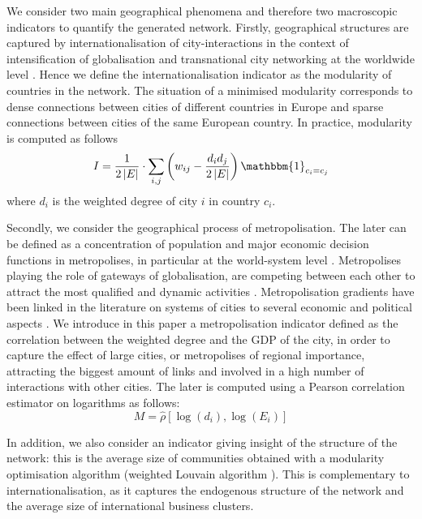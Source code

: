 \documentclass[10pt,letterpaper]{article}
\begin{document}
We consider two main geographical phenomena and therefore two macroscopic indicators to quantify the generated network. Firstly, geographical structures are captured by internationalisation of city-interactions in the context of intensification of globalisation and transnational city networking at the worldwide level \cite{taylor2001specification}. Hence we define the internationalisation indicator as the modularity of countries in the network. The situation of a minimised modularity corresponds to dense connections between cities of different countries in Europe and sparse connections between cities of the same European country. In practice, modularity is computed as follows
\begin{equation}
    I = \frac{1}{2 \left|E\right|} \cdot \sum_{i,j} \left(w_{ij} - \frac{d_i d_j}{2 \left|E\right|}\right) \mathbbm{1}_{c_i = c_j}
\end{equation}
where $d_i$ is the weighted degree of city $i$ in country $c_i$.

Secondly, we consider the geographical process of metropolisation. The later can be defined as a concentration of population and major economic decision functions in metropolises, in particular at the world-system level \cite{sassen1991global}. Metropolises playing the role of gateways of globalisation, are competing between each other to attract the most qualified and dynamic activities \cite{RozenblatPumain2007}. Metropolisation gradients have been linked in the literature on systems of cities to several economic and political aspects \cite{RozenblatPumain2018} \cite{PumainRozenblat2019} \cite{Zdanowskaetal2020}. We introduce in this paper a metropolisation indicator defined as the correlation between the weighted degree and the GDP of the city, in order to capture the effect of large cities, or metropolises of regional importance, attracting the biggest amount of links and involved in a high number of interactions with other cities.  The later is computed using a Pearson correlation estimator on logarithms as follows:
\begin{equation}
    M = \hat{\rho} \left[\log (d_i) , \log (E_i) \right]
\end{equation}

In addition, we also consider an indicator giving insight of the structure of the network: this is the average size of communities obtained with a modularity optimisation algorithm (weighted Louvain algorithm \cite{blondel2008fast}). This is complementary to internationalisation, as it captures the endogenous structure of the network and the average size of international business clusters.
\end{document}
